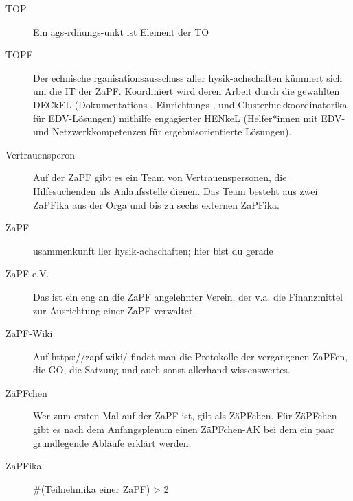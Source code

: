\begin{description}
	\item[TOP] Ein ags-rdnungs-unkt ist Element der TO
	\item[TOPF] Der echnische rganisationsausschuss aller hysik-achschaften kümmert sich um die IT der ZaPF. Koordiniert wird deren Arbeit durch die gewählten DECkEL (Dokumentations-, Einrichtungs-, und Clusterfuckkoordinatorika für EDV-Lösungen) mithilfe engagierter HENkeL (Helfer*innen mit EDV- und Netzwerkkompetenzen für ergebnisorientierte Lösungen). 
	\item[Vertrauensperon] Auf der ZaPF gibt es ein Team von Vertrauenspersonen, die Hilfesuchenden als Anlaufsstelle dienen. Das Team besteht aus zwei ZaPFika aus der Orga und bis zu sechs externen ZaPFika.
	\item[ZaPF] usammenkunft ller hysik-achschaften; hier bist du gerade
	\item[ZaPF e.V.] Das ist ein eng an die ZaPF angelehnter Verein, der v.a. die Finanzmittel zur Ausrichtung einer ZaPF verwaltet.
	\item[ZaPF-Wiki] Auf https://zapf.wiki/ findet man die Protokolle der vergangenen ZaPFen, die GO, die Satzung und auch sonst allerhand wissenswertes. 
	\item[ZäPFchen] Wer zum ersten Mal auf der ZaPF ist, gilt als ZäPFchen. Für ZäPFchen gibt es nach dem Anfangsplenum einen ZäPFchen-AK bei dem ein paar grundlegende Abläufe erklärt werden.
	\item[ZaPFika] \#(Teilnehmika einer ZaPF) > 2
\end{description}